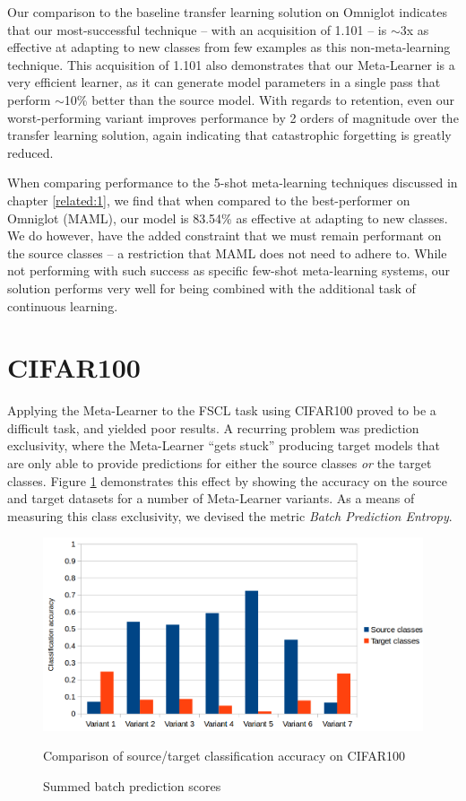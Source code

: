 \documentclass{report}
\begin{document}
Our comparison to the baseline transfer learning solution on Omniglot indicates that our most-successful technique -- with an acquisition of 1.101 -- is $\sim$3x as effective at adapting to new classes from few examples as this non-meta-learning technique. This acquisition of 1.101 also demonstrates that our Meta-Learner is a very efficient learner, as it can generate model parameters in a single pass that perform $\sim$10\% better than the source model. With regards to retention, even our worst-performing variant improves performance by 2 orders of magnitude over the transfer learning solution, again indicating that catastrophic forgetting is greatly reduced. \par
When comparing performance to the 5-shot meta-learning techniques discussed in chapter \ref{related:1}, we find that when compared to the best-performer on Omniglot (MAML\parencite{maml}), our model is 83.54\% as effective at adapting to new classes. We do however, have the added constraint that we must remain performant on the source classes -- a restriction that MAML does not need to adhere to. While not performing with such success as specific few-shot meta-learning systems, our solution performs very well for being combined with the additional task of continuous learning. \par

\section{CIFAR100}
Applying the Meta-Learner to the FSCL task using CIFAR100 proved to be a difficult task, and yielded poor results. A recurring problem was prediction exclusivity, where the Meta-Learner ``gets stuck'' producing target models that are only able to provide predictions for either the source classes \textit{or} the target classes. Figure \ref{fig:cifaraccuracy:1} demonstrates this effect by showing the accuracy on the source and target datasets for a number of Meta-Learner variants. As a means of measuring this class exclusivity, we devised the metric \textit{Batch Prediction Entropy}. \par
\begin{figure}[!h!]
	\centering
	\includegraphics[width=13cm]{cifaraccuracy}
	\caption{Summed batch prediction scores}
	Comparison of source/target classification accuracy on CIFAR100
	\label{fig:cifaraccuracy:1}
\end{figure}
\end{document}
